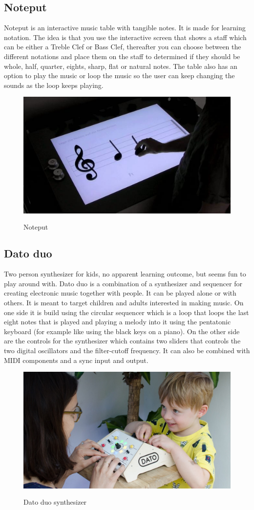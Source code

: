 \subsection{Noteput} 
Noteput is an interactive music table with tangible notes. It is made for learning notation. The idea is that you use the interactive screen that shows a staff which can be either a Treble Clef or Bass Clef, thereafter you can choose between the different notations and place them on the staff to determined if they should be whole, half, quarter, eights, sharp, flat or natural notes. The table also has an option to play the music or loop the music so the user can keep changing the sounds as the loop keeps playing.   
\begin{figure}[H]
	\centering
	\includegraphics[width=0.7\linewidth]{figure/Analysis/noteput}
	\label{fig:noteput}
	\caption{Noteput}
\end{figure}


\subsection{Dato duo} 
Two person synthesizer for kids, no apparent learning outcome, but seems fun to play around with. Dato duo is a combination of a synthesizer and sequencer for creating electronic music together with people. It can be played alone or with others. It is meant to target children and adults interested in making music. On one side it is build using the circular sequencer which is a loop that loops the last eight notes that is played and playing a melody into it using the pentatonic keyboard (for example like using the black keys on a piano). On the other side are the controls for the synthesizer which contains two sliders that controls the two digital oscillators and the filter-cutoff frequency. It can also be combined with MIDI components and a sync input and output. 
\begin{figure}[H]
	\centering
	\includegraphics[width=0.7\linewidth]{figure/Analysis/datoduo}
	\label{fig:datoduo}
	\caption{Dato duo synthesizer}
\end{figure}

